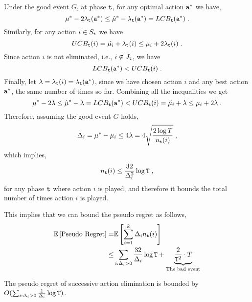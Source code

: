 Under the good event $G$, at phase ${\tt t}$, for any optimal action ${\tt a}^*$ we have,
\[
\mu^{*}-2\lambda_{\tt t}({\tt a}^*)\le\hat{\mu}^{*}-\lambda_{\tt t}({\tt a}^*)=LCB_{\tt t}({\tt a}^*)\;.
\]
Similarly, for any action $i\in S_{\tt t}$ we have
\[
UCB_{\tt t}(i)=\hat{\mu_{i}}+\lambda_{\tt t}(i)\leq\mu_{i}+2\lambda_{\tt t}(i)\;.
\]
Since action $i$ is not eliminated, i.e., $i\not\in J_{\tt t}$, we have
\[
LCB_{\tt t}({\tt a}^*)<UCB_{\tt t}(i)\;.
\]
Finally, let  $\lambda=\lambda_{{\tt t}}(i)=\lambda_{\tt t}({{\tt a}^*})$, since we have chosen action $i$ and any best action ${\tt a}^*$, the same number of times so far.
Combining all the inequalities we get
\[
 \mu^{*}-2\lambda\le\hat{\mu}^{*}-\lambda=LCB_{\tt t}({\tt a}^*)<UCB_{\tt t}(i)=\hat{\mu_{i}}+\lambda\leq\mu_{i}+2\lambda\;.
\]
Therefore, assuming the good event $G$ holds,
\[
\Delta_{i}=\mu^{*}-\mu_{i}\le4\lambda=4\sqrt{\frac{2\log
T}{n_{{\tt t}}(i)}}\;,
\]
which implies,
\[
 n_{{\tt t}}(i)\le\frac{32}{\Delta_{i}^{2}}\log {\tt T}\;,
\]
for any phase ${\tt t}$ where action $i$ is played, and therefore it bounds the total number of times action $i$ is played.

This implies that we can bound the pseudo regret as follows,
\begin{align*}
\mathbb{E}\left[\text{Pseudo Regret}\right]  = &  \mathbb{E}\left[\sum_{i=1}^{k}\Delta_{i}n_{{\tt t}}(i)\right]\\
  \le &  \sum_{i:\Delta_i>0}\frac{32}{\Delta_{i}}\log {\tt T}
  +\underbrace{\frac{2}{{\tt T}^{2}}\cdot T}_{\text{The bad event}}
\end{align*}


\begin{theorem}
\label{thm:MAB:SE1}
The pseudo regret of successive action elimination is bounded by $O(\sum_{i:\Delta_i>0}\frac{1}{\Delta_{i}}\log {\tt T})$.
\end{theorem}

